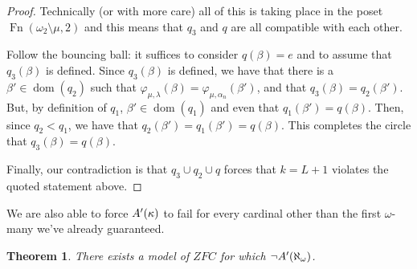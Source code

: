 \documentclass{amsart}
\theoremstyle{plain}
\newtheorem{theorem}{Theorem}
\theoremstyle{definition}
\theoremstyle{remark}
\theoremstyle{plain}
\theoremstyle{definition}
\theoremstyle{remark}
\begin{document}
\begin{proof}
            Technically (or with more care)  all of this is taking place in the
            poset $\operatorname{Fn}(\omega_2\setminus \mu,2)$ and this means
            that $q_3$ and $q$ are all compatible with each other.


            Follow
            the bouncing ball: it suffices to consider
             $q(\beta)=e$ and to assume that $q_3(\beta)$ is defined.
            Since $q_3(\beta)$ is defined, we have that
            there is a  $\beta'\in\mathop{dom}(q_2)$ such that $
             \varphi_{\mu,\lambda}(\beta) = \varphi_{\mu,\alpha_n}(\beta')$,
            and that $q_3(\beta) = q_2(\beta')$.
            But, by definition of $q_1$, $\beta'\in\mathop{dom}(q_1)$
            and even  that $q_1(\beta') = q(\beta)$.
             Then, since $q_2<q_1$, we have that $q_2(\beta')=q_1(\beta') =
             q(\beta)$. This completes the circle that $q_3(\beta) = q(\beta)$.
            \bigskip

            Finally, our contradiction is that $q_3\cup q_2\cup q$
            forces that
             $k=L+1$ violates the quoted statement above.
            \end{proof}


  We are also able to force \(A'(\kappa)\) to fail for every cardinal
  other than the first \(\omega\)-many we've already guaranteed.

  \begin{theorem}
    There exists a model of \(ZFC\) for which \(\neg A'(\aleph_\omega)\).
  \end{theorem}
\end{document}
